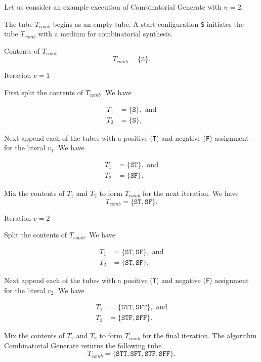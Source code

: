 	
\FloatBarrier

Let us consider an example execution of {\sc Combinatorial Generate} with $n = 2$.

\noindent The tube $T_{comb}$ begins as an empty tube.  A start configuration \texttt{S} initiates the tube $T_{comb}$ with a medium for combinatorial synthesis.

\noindent Contents of $T_{comb}$
\[
T_{comb} = \{ \texttt{S} \}.
\]

\noindent Iteration $v = 1$

First split the contents of $T_{comb}$.  We have

\begin{align*}
 T_1 &= \{ \texttt{S} \}, \text{ and} \\
 T_2 &= \{ \texttt{S} \}.
\end{align*}

Next append each of the tubes with a positive (\texttt{T}) and negative (\texttt{F}) assignment for the literal $v_1$.  We have

\begin{align*}
 T_1 &= \{ \texttt{ST} \}, \text{ and} \\
 T_2 &= \{ \texttt{SF} \}.
\end{align*}

Mix the contents of $T_1$ and $T_2$ to form $T_{comb}$ for the next iteration.  We have
\[
T_{comb} = \{\texttt{ST}, \texttt{SF}\}.
\]


\noindent Iteration $v = 2$

Split the contents of $T_{comb}$.  We have

\begin{align*}
 T_1 &= \{\texttt{ST}, \texttt{SF}\}, \text{ and} \\
 T_2 &= \{\texttt{ST}, \texttt{SF}\}.
\end{align*}

Next append each of the tubes with a positive (\texttt{T}) and negative (\texttt{F}) assignment for the literal $v_2$.  We have

\begin{align*}
 T_1 &= \{\texttt{STT}, \texttt{SFT}\}, \text{ and} \\
 T_2 &= \{\texttt{STF}, \texttt{SFF}\}.
\end{align*}

Mix the contents of $T_1$ and $T_2$ to form $T_{comb}$ for the final iteration.  The algorithm {\sc Combinatorial Generate} returns the following tube
\[
T_{comb} = \{\texttt{STT}, \texttt{SFT}, \texttt{STF}, \texttt{SFF}\}.
\]


